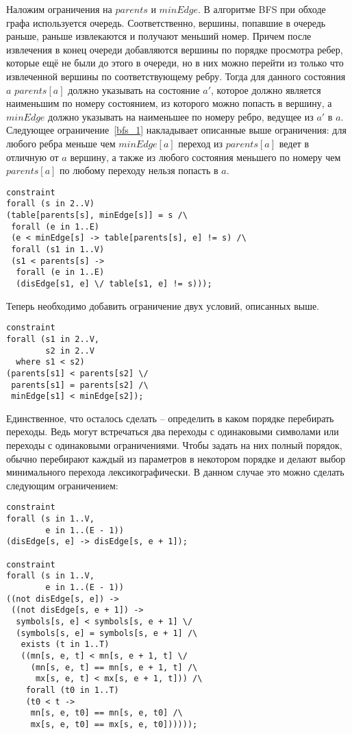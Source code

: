 \documentclass[times,specification,annotation]{itmo-student-thesis}
\begin{document}
Наложим ограничения на $parents$ и $minEdge$. В алгоритме BFS при обходе графа используется очередь. Соответственно, вершины, попавшие в очередь раньше, раньше извлекаются и получают меньший номер.
Причем после извлечения в конец очереди добавляются вершины по порядке просмотра ребер, которые ещё не были до этого в очереди, но в них можно перейти из только что извлеченной вершины по
соответствующему ребру. Тогда для данного состояния $a$ $parents[a]$ должно указывать на состояние $a'$, которое должно является наименьшим по номеру состоянием, из которого можно попасть в вершину,
а $minEdge$ должно указывать на наименьшее по номеру ребро, ведущее из $a'$ в $a$.
Следующее ограничение~\ref{bfs_1} накладывает описанные выше ограничения: для любого ребра меньше чем $minEdge[a]$ переход из $parents[a]$ ведет в отличную от $a$ вершину, а также из любого состояния
меньшего по номеру чем $parents[a]$ по любому переходу нельзя попасть в $a$.

\begin{lstlisting}[float=!h,language=Mzn,caption={BFS-ограничения-1},label={bfs_1}]
constraint
forall (s in 2..V)
(table[parents[s], minEdge[s]] = s /\
 forall (e in 1..E)
 (e < minEdge[s] -> table[parents[s], e] != s) /\
 forall (s1 in 1..V)
 (s1 < parents[s] ->
  forall (e in 1..E)
  (disEdge[s1, e] \/ table[s1, e] != s)));
\end{lstlisting}

Теперь необходимо добавить ограничение двух условий, описанных выше.

\begin{lstlisting}[float=!h,language=Mzn,caption={BFS-ограничения-2},label={bfs_2}]
constraint
forall (s1 in 2..V,
        s2 in 2..V
  where s1 < s2)
(parents[s1] < parents[s2] \/
 parents[s1] = parents[s2] /\
 minEdge[s1] < minEdge[s2]);
\end{lstlisting}

Единственное, что осталось сделать -- определить в каком порядке перебирать переходы. Ведь могут встречаться два переходы с одинаковыми символами или переходы с одинаковыми ограничениями.
Чтобы задать на них полный порядок, обычно перебирают каждый из параметров в некотором порядке и делают выбор минимального перехода лексикографически. В данном случае это можно сделать
следующим ограничением:

\begin{lstlisting}[float=!h,language=Mzn,caption={BFS-ограничения-3},label={bfs_3}]
constraint
forall (s in 1..V,
        e in 1..(E - 1))
(disEdge[s, e] -> disEdge[s, e + 1]);

constraint
forall (s in 1..V,
        e in 1..(E - 1))
((not disEdge[s, e]) -> 
 ((not disEdge[s, e + 1]) ->
  symbols[s, e] < symbols[s, e + 1] \/
  (symbols[s, e] = symbols[s, e + 1] /\
   exists (t in 1..T)
   ((mn[s, e, t] < mn[s, e + 1, t] \/
     (mn[s, e, t] == mn[s, e + 1, t] /\
      mx[s, e, t] < mx[s, e + 1, t])) /\
    forall (t0 in 1..T)
    (t0 < t ->
     mn[s, e, t0] == mn[s, e, t0] /\
     mx[s, e, t0] == mx[s, e, t0])))));
\end{lstlisting}
\end{document}
